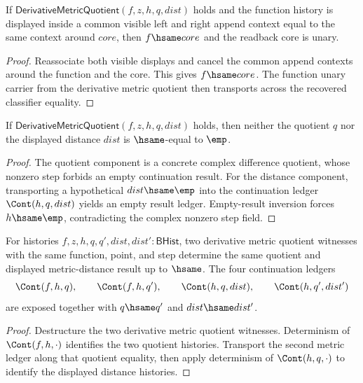 \begin{theorem}
\label{thm:derivative-metric-quotient-function-visible-context-readback}
If $\mathsf{DerivativeMetricQuotient}(f,z,h,q,dist)$ holds and the function
history is displayed inside a common visible left and right append context
equal to the same context around $core$, then $f\hsame core$ and the readback
core is unary.
\end{theorem}
\begin{proof}
Reassociate both visible displays and cancel the common append contexts around
the function and the core. This gives $f\hsame core$. The function unary carrier
from the derivative metric quotient then transports across the recovered
classifier equality.
\end{proof}

\begin{theorem}
\label{thm:derivative-metric-quotient-quotient-distance-nonempty}
If $\mathsf{DerivativeMetricQuotient}(f,z,h,q,dist)$ holds, then neither
the quotient $q$ nor the displayed distance $dist$ is $\hsame$-equal to
$\emp$.
\end{theorem}
\begin{proof}
The quotient component is a concrete complex difference quotient, whose
nonzero step forbids an empty continuation result. For the distance component,
transporting a hypothetical $dist\hsame\emp$ into the continuation ledger
$\Cont(h,q,dist)$ yields an empty result ledger. Empty-result inversion forces
$h\hsame\emp$, contradicting the complex nonzero step field.
\end{proof}

\begin{theorem}
\label{thm:derivative-metric-quotient-result-deterministic}
For histories $f,z,h,q,q',dist,dist':\mathsf{BHist}$, two derivative metric
quotient witnesses with the same function, point, and step determine the same
quotient and displayed metric-distance result up to $\hsame$. The four
continuation ledgers
$$
\Cont(f,h,q),\qquad \Cont(f,h,q'),\qquad \Cont(h,q,dist),\qquad
\Cont(h,q',dist')
$$
are exposed together with $q\hsame q'$ and $dist\hsame dist'$.
\end{theorem}
\begin{proof}
Destructure the two derivative metric quotient witnesses. Determinism of
$\Cont(f,h,\cdot)$ identifies the two quotient histories. Transport the second
metric ledger along that quotient equality, then apply determinism of
$\Cont(h,q,\cdot)$ to identify the displayed distance histories.
\end{proof}

